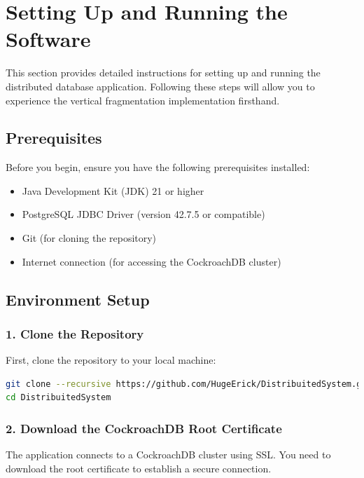 \documentclass[twoside]{article}
\begin{document}
\section{Setting Up and Running the Software}

This section provides detailed instructions for setting up and running the distributed database application. Following these steps will allow you to experience the vertical fragmentation implementation firsthand.

\subsection{Prerequisites}

Before you begin, ensure you have the following prerequisites installed:

\begin{itemize}
  \item Java Development Kit (JDK) 21 or higher
  \item PostgreSQL JDBC Driver (version 42.7.5 or compatible)
  \item Git (for cloning the repository)
  \item Internet connection (for accessing the CockroachDB cluster)
\end{itemize}

\subsection{Environment Setup}

\subsubsection{1. Clone the Repository}

First, clone the repository to your local machine:

\begin{lstlisting}[language=bash, caption=Cloning the Repository]
git clone --recursive https://github.com/HugeErick/DistribuitedSystem.git
cd DistribuitedSystem
\end{lstlisting}

\subsubsection{2. Download the CockroachDB Root Certificate}

The application connects to a CockroachDB cluster using SSL. You need to download the root certificate to establish a secure connection.
\end{document}

